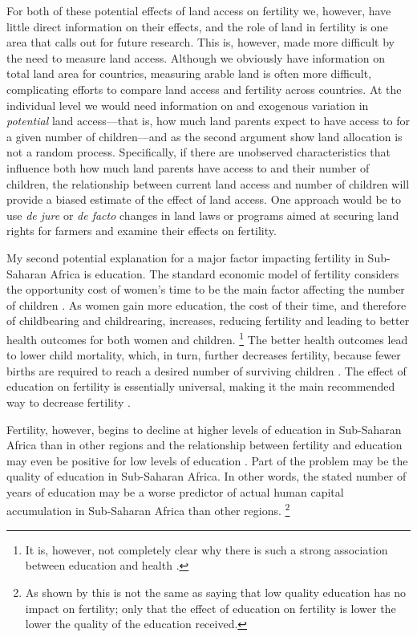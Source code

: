 \documentclass[letterpaper,12pt]{article}
\begin{document}
For both of these potential effects of land access on fertility we,
however, have little direct information on their effects, and the role
of land in fertility is one area that calls out for future research.
This is, however, made more difficult by the need to measure land access.
Although we obviously have information on total land area for countries,
measuring arable land is often more difficult, complicating efforts to
compare land access and fertility across countries.
At the individual level we would need information on and exogenous
variation in \emph{potential} land access---that is, how much land 
parents expect to have access to for a given number of children---and 
as the second argument show land allocation is not a random process.
Specifically, if there are unobserved characteristics that influence
both how much land parents have access to and their number of children,
the relationship between current land access and number of children 
will provide a biased estimate of the effect of land access.
One approach would be to use \emph{de jure} or \emph{de facto} changes 
in land laws or programs aimed at securing land rights for farmers 
and examine their effects on fertility.

My second potential explanation for a major factor impacting fertility in
Sub-Saharan Africa is education.
The standard economic model of fertility considers the opportunity cost
of women's time to be the main factor affecting the number of children
\citep{becker91}.
As women gain more education, the cost of their time, and therefore of
childbearing and childrearing, increases, reducing fertility and leading
to better health outcomes for both women and children.%
\footnote{
It is, however, not completely clear why there is such a strong
association between education and health
\citep{Thomas1991,Glewwe1999,Kovsted2002}.} 
The better health outcomes lead to lower child mortality, which, in turn, 
further decreases fertility, because fewer births are required to reach 
a desired number of surviving children \citep{Ainsworth1996}.
The effect of education on fertility is essentially universal, making it
the main recommended way to decrease fertility \citep{schultz02}.

Fertility, however, begins to decline at higher levels of education in
Sub-Saharan Africa than in other regions and the relationship between
fertility and education may even be positive for low levels of education
\citep{Ainsworth1996,Benefo1996,Thomas1996}.
Part of the problem may be the quality of education in Sub-Saharan
Africa.
In other words, the stated number of years of education may be a worse
predictor of actual human capital accumulation in Sub-Saharan Africa
than other regions.%
\footnote{
As shown by \citet{Oye2016} this is not the same as saying that low
quality education has no impact on fertility; only that the effect
of education on fertility is lower the lower the quality of the
education received.
}
\end{document}

